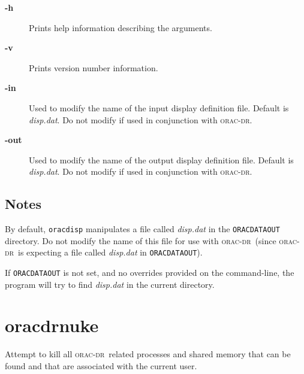 \documentclass[twoside,11pt]{article}
\renewcommand{\_}{\texttt{\symbol{95}}}
\newcommand{\oracdr}{\textsc{orac-dr}}
\begin{document}
\begin{description}
\item[\textbf{-h}] \mbox{}

Prints help information describing the arguments.

\item[\textbf{-v}] \mbox{}

Prints version number information.

\item[\textbf{-in}] \mbox{}

Used to modify the name of the input display definition file.
Default is \emph{disp.dat}. Do not modify if used in conjunction with
\oracdr.

\item[\textbf{-out}] \mbox{}

Used to modify the name of the output display definition file.
Default is \emph{disp.dat}. Do not modify if used in conjunction with
\oracdr.

\end{description}
\subsection*{Notes\label{oracdisp_NOTES}}

By default, \texttt{oracdisp} manipulates a file called \emph{disp.dat}
in the \texttt{ORAC\_DATA\_OUT} directory. Do not modify the name of this
file for use with \oracdr\ (since \oracdr\ is expecting a file
called \emph{disp.dat} in \texttt{ORAC\_DATA\_OUT}).



If \texttt{ORAC\_DATA\_OUT} is not set, and no overrides provided on the
command-line, the program will try to find \emph{disp.dat} in the current
directory.


\section{oracdr\_nuke\label{oracdr_nuke}}


Attempt to kill all \oracdr\ related processes and shared memory that
can be found and that are associated with the current user.
\end{document}
